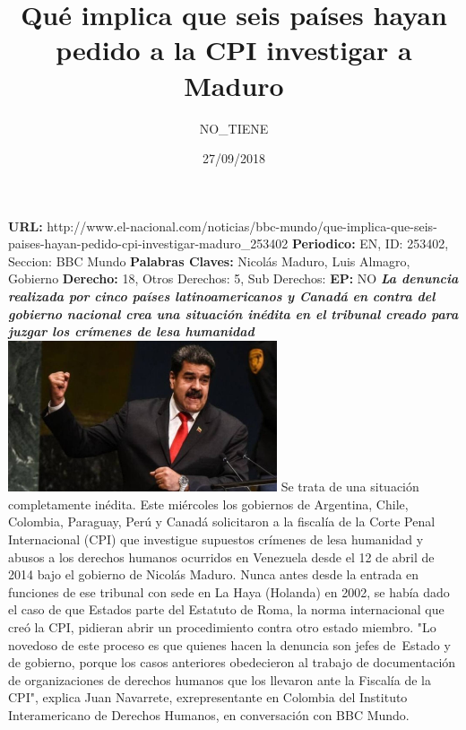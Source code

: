 \documentclass{article}%
\title{\textbf{Qué implica que seis países hayan pedido a la CPI investigar a Maduro}}%
\author{NO\_TIENE}%
\date{27/09/2018}%
\begin{document}
%
\normalsize%
\maketitle%
\textbf{URL: }%
http://www.el{-}nacional.com/noticias/bbc{-}mundo/que{-}implica{-}que{-}seis{-}paises{-}hayan{-}pedido{-}cpi{-}investigar{-}maduro\_253402\newline%
%
\textbf{Periodico: }%
EN, %
ID: %
253402, %
Seccion: %
BBC Mundo\newline%
%
\textbf{Palabras Claves: }%
Nicolás Maduro, Luis Almagro, Gobierno\newline%
%
\textbf{Derecho: }%
18, %
Otros Derechos: %
5, %
Sub Derechos: %
\newline%
%
\textbf{EP: }%
NO\newline%
\newline%
%
\textbf{\textit{La denuncia realizada por cinco países latinoamericanos y Canadá en contra del gobierno nacional crea una situación inédita en el tribunal creado para juzgar los crímenes de lesa humanidad}}%
\newline%
\newline%
%
\includegraphics[width=300px]{224.jpg}%
\newline%
%
Se trata de una situación completamente inédita.%
\newline%
%
Este miércoles los gobiernos de Argentina, Chile, Colombia, Paraguay, Perú y Canadá solicitaron a la fiscalía de la Corte Penal Internacional (CPI) que investigue supuestos crímenes de lesa humanidad y abusos a los derechos humanos ocurridos en Venezuela desde el 12 de abril de 2014 bajo el gobierno de Nicolás Maduro.%
\newline%
%
Nunca antes desde la entrada en funciones de ese tribunal con sede en La Haya (Holanda) en 2002, se había dado el caso de que Estados parte del Estatuto de Roma, la norma internacional que creó la CPI, pidieran abrir un procedimiento contra otro estado miembro.%
\newline%
%
"Lo novedoso de este proceso es que quienes hacen la denuncia son jefes de~Estado y de gobierno, porque los casos anteriores obedecieron al trabajo de documentación de organizaciones de derechos humanos que los llevaron ante la Fiscalía de la CPI", explica Juan Navarrete, exrepresentante en Colombia del Instituto Interamericano de Derechos Humanos, en conversación con BBC Mundo.%
\end{document}
